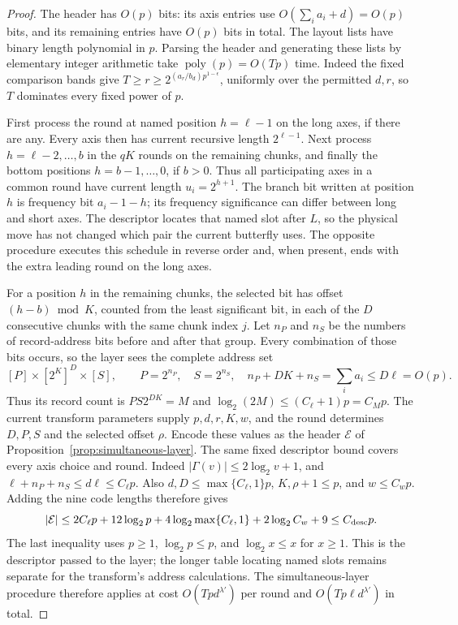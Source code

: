 \documentclass[11pt]{article}
\theoremstyle{definition}
\begin{document}
\begin{proof}
The header has $O(p)$ bits: its axis entries use
$O(\sum_i a_i+d)=O(p)$ bits, and its remaining entries have
$O(p)$ bits in total. The layout lists have binary length polynomial
in $p$. Parsing the header and generating these lists by elementary
integer arithmetic take
$\operatorname{poly}(p)=O(Tp)$ time. Indeed the fixed comparison bands
give $T\geq r\geq2^{(a_r/b_d)p^{1-\epsilon}}$, uniformly over the
permitted $d,r$, so $T$ dominates every fixed power of $p$.

First process the round at named position $h=\ell-1$ on the long
axes, if there are any.  Every axis then has current recursive
length $2^{\ell-1}$.  Next process $h=\ell-2,\ldots,b$ in the $qK$
rounds on the remaining chunks, and finally the bottom positions
$h=b-1,\ldots,0$, if $b>0$.  Thus all participating axes in a
common round have current length $u_i=2^{h+1}$.
The branch bit written at position $h$ is frequency bit $a_i-1-h$;
its frequency significance can differ between long and short axes.
The descriptor locates that named slot after $L$, so the physical
move has not changed which pair the current butterfly uses.  The
opposite procedure executes this schedule in reverse order and,
when present, ends with the extra leading round on the long axes.

For a position $h$ in the remaining chunks, the selected bit has
offset $(h-b)\bmod K$, counted from the least significant bit, in
each of the $D$ consecutive chunks with the same chunk index $j$.
Let $n_P$ and $n_S$ be the numbers of record-address bits before and
after that group.  Every combination of those bits occurs, so the
layer sees the complete address set
\[
 [P]\times[2^K]^D\times[S],\qquad
 P=2^{n_P},\quad S=2^{n_S},\quad
 n_P+DK+n_S=\sum_i a_i\leq D\ell=O(p).
\]
Thus its record count is $PS2^{DK}=M$ and
$\log_2(2M)\leq(C_\ell+1)p=C_Mp$.
The current transform parameters supply $p,d,r,K,w$, and the round
determines $D,P,S$ and the selected offset $\rho$. Encode these values
as the header $\mathcal E$ of Proposition~\ref{prop:simultaneous-layer}.
The same fixed descriptor bound covers every axis choice and round.
Indeed $|\Gamma(v)|\leq2\log_2v+1$, and
$\ell+n_P+n_S\leq d\ell\leq C_\ell p$. Also
$d,D\leq\max\{C_\ell,1\}p$, $K,\rho+1\leq p$, and $w\leq C_wp$.
Adding the nine code lengths therefore gives
\[
 |\mathcal E|
 \leq 2C_\ell p+12\log_2p+
        4\log_2\max\{C_\ell,1\}+2\log_2C_w+9
 \leq C_{\rm desc}p.
\]
The last inequality uses $p\geq1$, $\log_2p\leq p$, and
$\log_2x\leq x$ for $x\geq1$.
This is the descriptor passed to the layer; the longer
table locating named slots remains separate for the transform's address
calculations.
The simultaneous-layer procedure therefore applies at cost
$O(Tpd^{\lambda'})$ per round and $O(Tp\ell d^{\lambda'})$ in total.


\end{proof}
\end{document}
